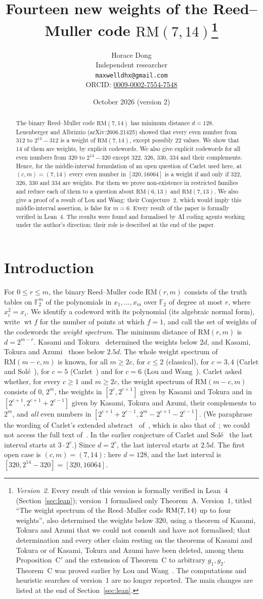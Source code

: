 \documentclass[11pt]{article}
\title{Fourteen new weights of the Reed--Muller code $\mathrm{RM}(7,14)$\thanks{\emph{Version~2.}
Every result of this version is formally verified in Lean~4
(Section~\ref{sec:lean}); version~1 formalised only Theorem~A. Version~1, titled
``The weight spectrum of the Reed--Muller code $\RM(7,14)$ up to four weights'',
also determined the weights below $320$, using a theorem of Kasami, Tokura and
Azumi that we could not consult and have not formalised; that determination and
every other claim resting on the theorems of Kasami and Tokura or of Kasami,
Tokura and Azumi have been deleted, among them Proposition~C$'$ and the
extension of Theorem~C to arbitrary $g_1,g_2$. Theorem~C was proved earlier by
Lou and Wang~\cite{lw2}. The computations and heuristic searches of version~1
are no longer reported. The main changes are listed at the end of
Section~\ref{sec:lean}.}}
\author{Horace Dong\\ \small Independent researcher\\
\small\texttt{maxwelldhx@gmail.com}\\
\small ORCID: \href{https://orcid.org/0009-0002-7554-7548}{0009-0002-7554-7548}}
\date{October 2026 (version 2)}
\theoremstyle{remark}
\newcommand{\F}{\mathbb F}
\newcommand{\RM}{\mathrm{RM}}
\DeclareMathOperator{\wt}{wt}
\begin{document}
\maketitle
\begin{abstract}
The binary Reed--Muller code $\RM(7,14)$ has minimum distance $d=128$.
Leuenberger and Albrizzio (arXiv:2606.21425) showed that every even number from
$312$ to $2^{14}-312$ is a weight of $\RM(7,14)$, except possibly $22$ values.
We show that $14$ of them are weights, by explicit codewords. We also give
explicit codewords for all even numbers from $320$ to $2^{14}-320$ except $322$,
$326$, $330$, $334$ and their complements. Hence, for the middle-interval
formulation of an open question of Carlet used here, at $(c,m)=(7,14)$ every
even number in $[320,16064]$ is a weight if and only if $322$, $326$, $330$
and $334$ are weights. For them we prove non-existence in
restricted families and reduce each of them to a question about $\RM(6,13)$ and
$\RM(7,13)$. We also give a proof of a result of Lou and Wang: their
Conjecture~2, which would imply this middle-interval assertion, is false for
$m=6$. Every
result of the paper is formally verified in Lean~4. The results were found and
formalised by AI coding agents working under the author's direction; their role
is described at the end of the paper.
\end{abstract}

\section{Introduction}

For $0\le r\le m$, the binary Reed--Muller code $\RM(r,m)$ consists of the
truth tables on $\F_2^m$ of the polynomials in $x_1,\dots,x_m$ over $\F_2$ of
degree at most $r$, where $x_i^2=x_i$. We identify a codeword with its
polynomial (its algebraic normal form), write $\wt f$ for the number of points
at which $f=1$, and call the set of weights of the codewords the \emph{weight
spectrum}. The minimum distance of $\RM(r,m)$ is $d=2^{m-r}$. Kasami and
Tokura~\cite{kt} determined the weights below $2d$, and Kasami, Tokura and
Azumi~\cite{kta} those below $2.5d$. The whole weight spectrum of $\RM(m-c,m)$
is known, for all $m\ge2c$, for $c\le2$ (classical), for $c=3,4$ (Carlet and
Sol\'e~\cite{cs}), for $c=5$ (Carlet~\cite{c24}) and for $c=6$ (Lou and
Wang~\cite{lw}).
Carlet asked~\cite{c24} whether, for every $c\ge1$ and $m\ge2c$, the weight
spectrum of $\RM(m-c,m)$ consists of $0$, $2^m$, the weights in $[2^c,2^{c+1}]$
given by Kasami and Tokura and in $[2^{c+1},2^{c+1}+2^{c-1}]$ given by Kasami,
Tokura and Azumi, their complements to $2^m$, and \emph{all} even numbers in
$[2^{c+1}+2^{c-1},2^m-2^{c+1}-2^{c-1}]$. (We paraphrase the wording of Carlet's
extended abstract~\cite{cdmd} of~\cite{c24}, which is also that
of~\cite[Conjecture~1]{la}; we could not access the full text of~\cite{c24}.
In the earlier conjecture of Carlet and Sol\'e~\cite[Section~6]{cs} the last
interval starts at $3\cdot2^c$.) Since $d=2^c$, the last interval starts at
$2.5d$. The first open case is $(c,m)=(7,14)$: here $d=128$, and the last
interval is $[320,2^{14}-320]=[320,16064]$.
\end{document}

